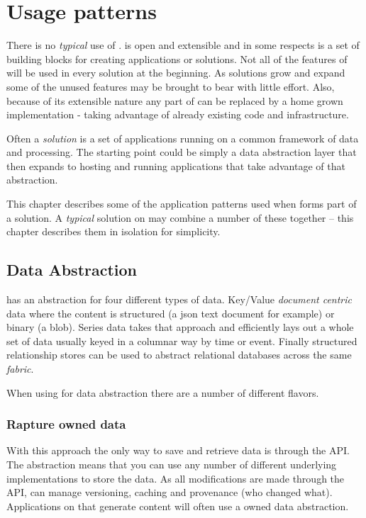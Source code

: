 \chapter{Usage patterns}
There is no \emph{typical} use of \Rapture. \Rapture is open and extensible and in some respects
is a set of building blocks for creating applications or solutions. Not all of the features of
\Rapture will be used in every solution at the beginning. As solutions grow and expand some of
the unused features may be brought to bear with little effort. Also, because of its extensible
nature any part of \Rapture can be replaced by a home grown implementation - taking advantage of
already existing code and infrastructure.

Often a \Rapture \emph{solution} is a set of applications running on a common framework of data
and processing. The starting point could be simply a data abstraction layer that then expands to
hosting and running applications that take advantage of that abstraction.

This chapter describes some of the application patterns used when \Rapture forms part of a solution.
A \emph{typical} solution on \Rapture may combine a number of these together -- this chapter describes
them in isolation for simplicity.

\section{Data Abstraction}

\Rapture has an abstraction for four different types of data. Key/Value \emph{document centric} data where the
content is structured (a json text document for example) or binary (a blob). Series data takes that approach and
efficiently lays out a whole set of data usually keyed in a columnar way by time or event. Finally structured
relationship stores can be used to abstract relational databases across the same \emph{fabric}.

When using \Rapture for data abstraction there are a number of different flavors.

\subsection{Rapture owned data}
With this approach the only way to save and retrieve data is through the \Rapture API. The abstraction means that
you can use any number of different underlying implementations to store the data. As all modifications are made through
the API, \Rapture can manage versioning, caching and provenance (who changed what). Applications on \Rapture that generate
content will often use a \Rapture owned data abstraction.

